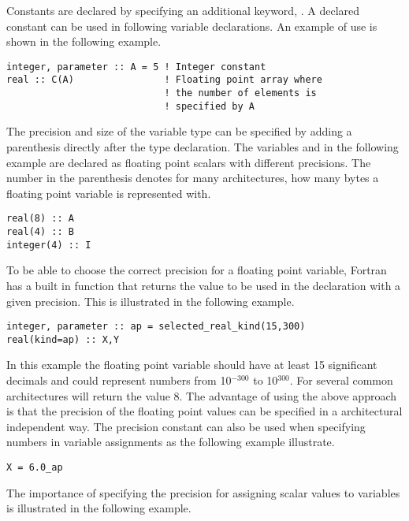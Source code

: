 Constants are declared by specifying an additional keyword, . A declared constant can be used in following variable declarations. An example of use is shown in the following example.

\begin{lstlisting}[texcl]
integer, parameter :: A = 5 ! Integer constant
real :: C(A)                ! Floating point array where
                            ! the number of elements is
                            ! specified by A
\end{lstlisting}

The precision and size of the variable type can be specified by adding a parenthesis directly after the type declaration. The variables  and  in the following example are declared as floating point scalars with different precisions. The number in the parenthesis denotes for many architectures, how many bytes a floating point variable is represented with.

\begin{lstlisting}[texcl]
real(8) :: A
real(4) :: B
integer(4) :: I
\end{lstlisting}

To be able to choose the correct precision for a floating point variable, Fortran has a built in function  that returns the value to be used in the declaration with a given precision. This is illustrated in the following example.

\begin{lstlisting}
integer, parameter :: ap = selected_real_kind(15,300)
real(kind=ap) :: X,Y
\end{lstlisting}

In this example the floating point variable should have at least 15 significant decimals and could represent numbers from 10$^{-300}$ to 10$^{300}$. For several common architectures  will return the value 8. The advantage of using the above approach is that the precision of the floating point values can be specified in a architectural independent way. The precision constant can also be used when
specifying numbers in variable assignments as the following example illustrate.

\begin{lstlisting}
X = 6.0_ap
\end{lstlisting}

The importance of specifying the precision for assigning scalar values to variables is illustrated in the following example.

